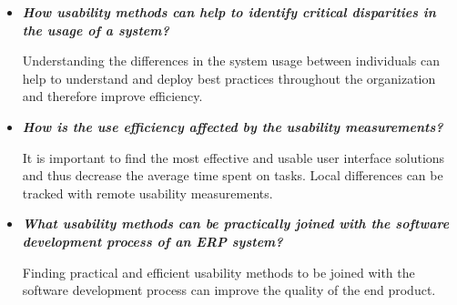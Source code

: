 \documentclass[12pt,a4paper,oneside,pdftex]{report}
\begin{document}
\begin{itemize}
\item \textbf{\emph{How usability methods can help to identify critical disparities in the usage of a system?}}

Understanding the differences in the system usage between individuals can help to understand and deploy best practices throughout the organization and therefore improve efficiency.

\item \textbf{\emph{How is the use efficiency affected by the usability measurements?}}

It is important to find the most effective and usable user interface solutions and thus decrease the average time spent on tasks. Local differences can be tracked with remote usability measurements.

\item \textbf{\emph{What usability methods can be practically joined with the software development process of an ERP system?}}

Finding practical and efficient usability methods to be joined with the software development process can improve the quality of the end product.

\end{itemize}




\end{document}
